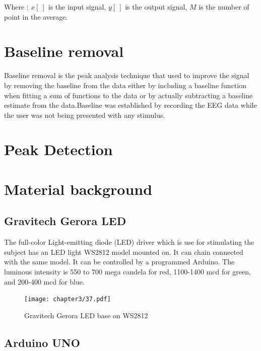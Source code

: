 Where : $x[~]$ is the input signal, $y[~]$ is the output signal,
	   $M$ is the number of point in the average.

\section{Baseline removal}
\hspace{1.5cm} Baseline removal is the peak analysis technique that used to improve the signal by removing the baseline from the data either by including a baseline function when fitting a sum of functions to the data or by actually subtracting a baseline estimate from the data.Baseline was established by recording the EEG data while the user was not being presented with any stimulus. \\

\section{Peak Detection}



\newpage
\section{Material background}

\subsection{Gravitech Gerora LED\cite{ref13}}

\hspace{1.5cm} The full-color Light-emitting diode (LED) driver which is use for stimulating the subject has an LED light WS2812 model mounted on. It can chain connected with the same model. It can be controlled by a programmed Arduino. The luminous intensity is 550 to 700 mega candela for red, 1100-1400 mcd for green, and 200-400 mcd for blue.
\begin{figure}[ht]
	\centering
	\texttt{[image: chapter3/37.pdf]}
	\caption{Gravitech Gerora LED base on WS2812}
\end{figure}

\subsection{Arduino UNO\cite{ref14}}

